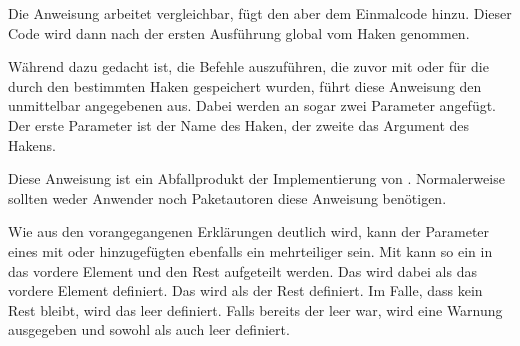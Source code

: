 Die Anweisung  arbeitet
vergleichbar, fügt den  aber dem Einmalcode hinzu. Dieser Code
wird dann nach der ersten Ausführung global vom Haken genommen.%
\EndIndexGroup

\begin{Declaration}
\end{Declaration}
Während
 dazu gedacht ist, die Befehle
auszuführen, die zuvor mit  oder
 für die durch den
 bestimmten Haken gespeichert wurden, führt diese Anweisung
den unmittelbar angegebenen  aus. Dabei werden an 
sogar zwei Parameter angefügt. Der erste Parameter ist der Name des Haken, der
zweite das Argument des Hakens.

Diese Anweisung ist ein Abfallprodukt der Implementierung von
. Normalerweise sollten weder Anwender
noch Paketautoren diese Anweisung benötigen.%
\EndIndexGroup

\begin{Declaration}
\end{Declaration}
Wie aus den vorangegangenen
Erklärungen deutlich wird, kann der Parameter eines mit
 oder
 hinzugefügten 
ebenfalls ein mehrteiliger  sein. Mit 
kann so ein  in das vordere Element und den Rest
aufgeteilt werden. Das  wird dabei als das vordere Element
definiert. Das  wird als der Rest definiert. Im Falle, dass
kein Rest bleibt, wird das  leer definiert. Falls bereits der
 leer war, wird eine Warnung ausgegeben und sowohl
 als auch  leer definiert.

